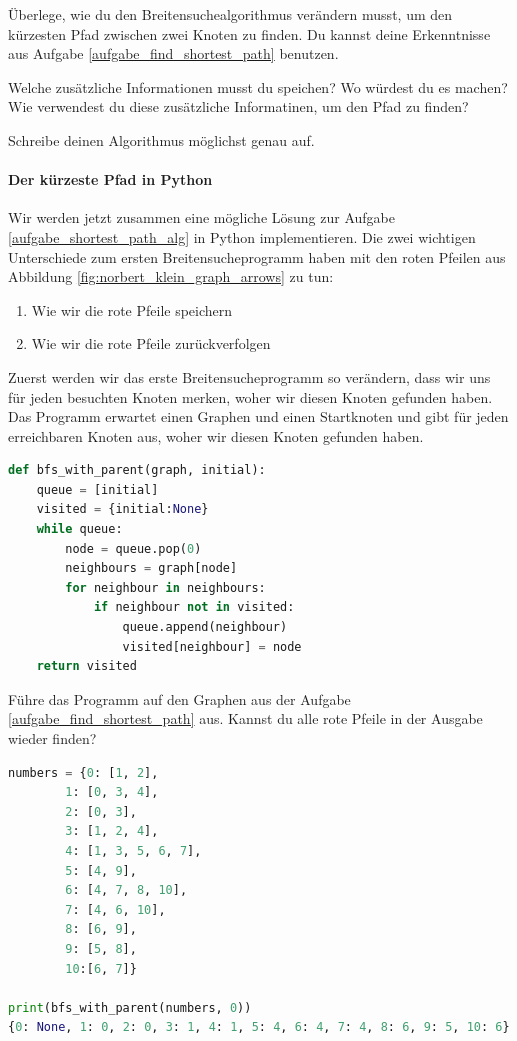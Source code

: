 \begin{aufgabe}\label{aufgabe_shortest_path_alg}
Überlege, wie du den Breitensuchealgorithmus verändern musst, um den kürzesten Pfad zwischen zwei Knoten zu finden. Du kannst deine Erkenntnisse aus Aufgabe \ref{aufgabe_find_shortest_path} benutzen.

Welche zusätzliche Informationen musst du speichen? Wo würdest du es machen?
Wie verwendest du diese zusätzliche Informatinen, um den Pfad zu finden?

Schreibe deinen Algorithmus möglichst genau auf.
\end{aufgabe}



\paragraph{Der kürzeste Pfad in Python}
Wir werden jetzt zusammen eine mögliche Lösung zur Aufgabe \ref{aufgabe_shortest_path_alg} in Python implementieren. Die zwei wichtigen Unterschiede zum ersten Breitensucheprogramm haben mit den roten Pfeilen aus Abbildung \ref{fig:norbert_klein_graph_arrows} zu tun:
\begin{enumerate}
    \item Wie wir die rote Pfeile speichern
    \item Wie wir die rote Pfeile zurückverfolgen
\end{enumerate}

Zuerst werden wir das erste Breitensucheprogramm so verändern, dass wir uns für jeden besuchten Knoten merken, woher wir diesen Knoten gefunden haben. Das Programm erwartet einen Graphen und einen Startknoten und gibt für jeden erreichbaren Knoten aus, woher wir diesen Knoten gefunden haben.

\begin{lstlisting}[language=Python, caption={Programm, welches die rote Pfeile ausgehend von einem Startknoten berechnet und ausgibt. Die einzigen zwei Zeilen, die sich verändert haben, sind 3 und 10.}, label={bfs_with_parent}]
def bfs_with_parent(graph, initial):
    queue = [initial]
    visited = {initial:None}
    while queue:
        node = queue.pop(0)
        neighbours = graph[node]
        for neighbour in neighbours:
            if neighbour not in visited:
                queue.append(neighbour)
                visited[neighbour] = node
    return visited
\end{lstlisting}

Führe das Programm auf den Graphen aus der Aufgabe \ref{aufgabe_find_shortest_path} aus. Kannst du alle rote Pfeile in der Ausgabe wieder finden?
\begin{lstlisting}[language=Python]
numbers = {0: [1, 2],
        1: [0, 3, 4],
        2: [0, 3],
        3: [1, 2, 4],
        4: [1, 3, 5, 6, 7],
        5: [4, 9],
        6: [4, 7, 8, 10],
        7: [4, 6, 10],
        8: [6, 9],
        9: [5, 8],
        10:[6, 7]}

print(bfs_with_parent(numbers, 0))
{0: None, 1: 0, 2: 0, 3: 1, 4: 1, 5: 4, 6: 4, 7: 4, 8: 6, 9: 5, 10: 6}
\end{lstlisting}

